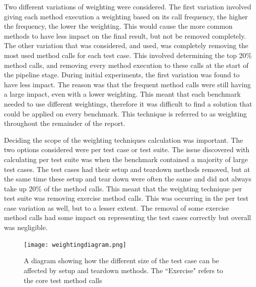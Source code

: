 Two different variations of weighting were considered. The first variation involved giving each method execution a weighting based on its call frequency, the higher the frequency, the lower the weighting. This would cause the more common methods to have less impact on the final result, but not be removed completely. The other variation that was considered, and used, was completely removing the most used method calls for each test case. This involved determining the top 20\% method calls, and removing every method execution to these calls at the start of the pipeline stage. During initial experiments, the first variation was found to have less impact. The reason was that the frequent method calls were still having a large impact, even with a lower weighting. This meant that each benchmark needed to use different weightings, therefore it was difficult to find a solution that could be applied on every benchmark. This technique is referred to as weighting throughout the remainder of the report.

Deciding the scope of the weighting techniques calculation was important. The two options considered were per test case or test suite. The issue discovered with calculating per test suite was when the benchmark contained a majority of large test cases. The test cases had their setup and teardown methods removed, but at the same time these setup and tear down were often the same and did not always take up 20\% of the method calls. This meant that the weighting technique per test suite was removing exercise method calls. This was occurring in the per test case variation as well, but to a lesser extent. The removal of some exercise method calls had some impact on representing the test cases correctly but overall was negligible.

\begin{figure}[h]
\texttt{[image: weightingdiagram.png]}
\caption{A diagram showing how the different size of the test case can be affected by setup and teardown methods. The ``Exercise" refers to the core test method calls}
\label{fig:weightingdiagram}
\end{figure}
